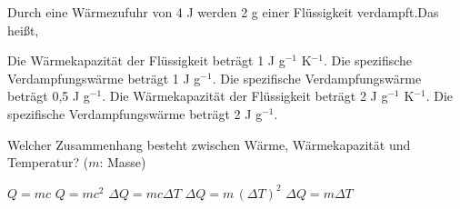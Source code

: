 \documentclass[11pt]{exam}
\begin{document}
\begin{questions}
\vspace{3mm}\question Durch eine Wärmezufuhr von 4 J werden 2 g einer Flüssigkeit verdampft.Das heißt,

\begin{choices}
	\choice Die Wärmekapazität der Flüssigkeit beträgt 1 J g\(^{-1}\) K\(^{-1}\).
	\choice Die spezifische Verdampfungswärme beträgt 1 J g\(^{-1}\).
	\choice Die spezifische Verdampfungswärme beträgt 0,5 J g\(^{-1}\).
	\choice Die Wärmekapazität der Flüssigkeit beträgt 2 J g\(^{-1}\) K\(^{-1}\).
	\choice Die spezifische Verdampfungswärme beträgt 2 J g\(^{-1}\).
\end{choices}

\vspace{3mm}\question Welcher Zusammenhang besteht zwischen Wärme, Wärmekapazität und Temperatur? (\(m\): Masse)

\begin{choices}
	\choice \(Q = m c\)
	\choice \(Q = m c^2\)
	\choice \(\Delta Q = m c \Delta T\)
	\choice \(\Delta Q = m \, (\Delta T)^2\)
	\choice \(\Delta Q = m \Delta T\)
\end{choices}

\vspace{3mm}\end{questions}
\end{document}
